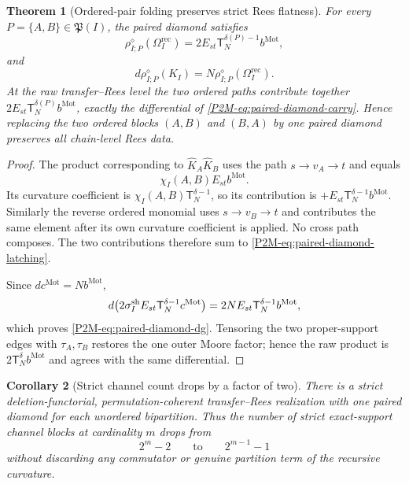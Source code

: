 \documentclass[11pt]{article}
\newtheorem{theorem}{Theorem}[section]
\newtheorem{corollary}[theorem]{Corollary}
\theoremstyle{remark}
\newcommand{\Mot}{\mathrm{Mot}}
\begin{document}
\begin{theorem}[Ordered-pair folding preserves strict Rees flatness]
\label{P2M-thm:ordered-pair-folding}
For every $P=\{A,B\}\in\mathfrak P(I)$, the paired diamond satisfies
\begin{equation}
 \boxed{
 \rho_{I;P}^{\diamond}(\Omega_I^{\mathrm{rec}})
 =2E_{st}\mathsf T_N^{\delta(P)-1}b^{\Mot},}
 \label{P2M-eq:paired-diamond-latching}
\end{equation}
and
\begin{equation}
 \boxed{
 d\rho_{I;P}^{\diamond}(K_I)
 =N\rho_{I;P}^{\diamond}(\Omega_I^{\mathrm{rec}}).}
 \label{P2M-eq:paired-diamond-dg}
\end{equation}
At the raw transfer--Rees level the two ordered paths contribute together
$2E_{st}\mathsf T_N^{\delta(P)}b^{\Mot}$, exactly the differential of
\eqref{P2M-eq:paired-diamond-carry}.  Hence replacing the two ordered blocks
$(A,B)$ and $(B,A)$ by one paired diamond preserves all chain-level Rees data.
\end{theorem}

\begin{proof}
The product corresponding to $\widehat K_A\widehat K_B$ uses the path
$s\to v_A\to t$ and equals
\[
 \chi_I(A,B)E_{st}b^{\Mot}.
\]
Its curvature coefficient is
$\chi_I(A,B)\mathsf T_N^{\delta-1}$, so its contribution is
$+E_{st}\mathsf T_N^{\delta-1}b^{\Mot}$.  Similarly the reverse ordered
monomial uses $s\to v_B\to t$ and contributes the same element after its own
curvature coefficient is applied.  No cross path composes.  The two
contributions therefore
sum to \eqref{P2M-eq:paired-diamond-latching}.

Since $dc^{\Mot}=Nb^{\Mot}$,
\[
 d\bigl(2\sigma_I^{\rm sh}E_{st}
 \mathsf T_N^{\delta-1}c^{\Mot}\bigr)
 =2N E_{st}\mathsf T_N^{\delta-1}b^{\Mot},
\]
which proves \eqref{P2M-eq:paired-diamond-dg}.  Tensoring the two proper-support
edges with $\tau_A,\tau_B$ restores the one outer Moore factor; hence the raw product is
$2\mathsf T_N^\delta b^{\Mot}$ and agrees with the same differential.
\end{proof}

\begin{corollary}[Strict channel count drops by a factor of two]
\label{P2M-cor:strict-unordered-channel-count}
There is a strict deletion-functorial, permutation-coherent transfer--Rees
realization with one paired diamond for each unordered bipartition.  Thus the
number of strict exact-support channel blocks at cardinality $m$ drops from
\[
 2^m-2
 \qquad\text{to}\qquad
 \boxed{2^{m-1}-1}
\]
without discarding any commutator or genuine partition term of the recursive
curvature.
\end{corollary}
\end{document}
